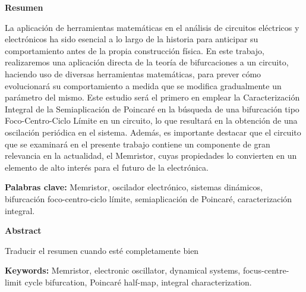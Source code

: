 \documentclass[12pt,a4paper]{report} %
\begin{document}
	\clearpage
	\null
	\thispagestyle{empty}
	
	\newpage

	\setcounter{page}{1}
	\thispagestyle{plain}
\begin{center}
	\LARGE\textbf{Resumen}
\end{center}
\begin{minipage}{\textwidth}
	
	La aplicación de herramientas matemáticas en el análisis de circuitos eléctricos y electrónicos ha sido esencial a lo largo de la historia para anticipar su comportamiento antes de la propia construcción física. En este trabajo, realizaremos una aplicación directa de la teoría de bifurcaciones a un circuito, haciendo uso de diversas herramientas matemáticas, para prever cómo evolucionará su comportamiento a medida que se modifica gradualmente un parámetro del mismo. Este estudio será el primero en emplear la Caracterización Integral de la Semiaplicación de Poincaré en la búsqueda de una bifurcación tipo Foco-Centro-Ciclo Límite en un circuito, lo que resultará en la obtención de una oscilación periódica en el sistema. Además, es importante destacar que el circuito que se examinará en el presente trabajo contiene un componente de gran relevancia en la actualidad, el Memristor, cuyas propiedades lo convierten en un elemento de alto interés para el futuro de la electrónica.
	
	\vspace{0.5cm}
	\noindent \textbf{Palabras clave:} Memristor, oscilador electrónico, sistemas dinámicos, bifurcación foco-centro-ciclo límite, semiaplicación de Poincaré, caracterización integral.
\end{minipage}

\vspace{1cm}

\begin{center}
	\LARGE\textbf{Abstract}
\end{center}
\begin{minipage}{\textwidth}
	Traducir el resumen cuando esté completamente bien
	
	\vspace{0.5cm}
	\noindent \textbf{Keywords:} Memristor, electronic oscillator, dynamical systems, focus-centre-limit cycle bifurcation, Poincaré half-map, integral characterization.
\end{minipage}
\newpage

\tableofcontents

	\newpage
\end{document}
